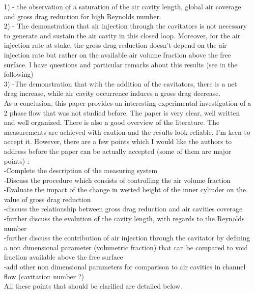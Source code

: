 \documentclass[10pt]{article}
\begin{document}
{1)     - the observation of a saturation of the air cavity length, global air coverage and gross drag reduction for high Reynolds number.\\
2)     - The demonstration that air injection through the cavitators is not necessary to generate and sustain the air cavity in this closed loop. Moreover, for the air injection rate at stake, the gross drag reduction doesn't depend on the air injection rate but rather on the available air volume fraction above the free surface. I have questions and particular remarks about this results (see in the following)\\
3)      -The demonstration that with the addition of the cavitators, there is a net drag increase, while air cavity occurrence induces a gross drag decrease. \vspace{\baselineskip}\\
As a conclusion, this paper provides an interesting experimental investigation of a 2 phase flow that was not studied before. The paper is very clear, well written and well organized. There is also a good overview of the literature. The measurements are achieved with caution and the results look reliable. I'm keen to accept it. However, there are a few points which I would like the authors to address before the paper can be actually accepted (some of them are major points) : \\
            -Complete the description of the measuring system\\
            -Discuss the procedure which consists of controlling the air volume fraction\\
            -Evaluate the impact of the change in wetted height of the inner cylinder on the value of gross drag reduction\\
            -discuss the relationship between gross drag reduction and air cavities coverage\\
            -further discuss the evolution of the cavity length, with regards to the Reynolds number\\
            -further discuss the contribution of air injection through the cavitator by defining a non dimensional parameter (volumetric fraction) that can be compared to void fraction available above the free surface\\
            -add other non dimensional parameters for comparison to air cavities in channel flow (cavitation number ?) \vspace{\baselineskip}\\
All these points that should be clarified are detailed below.}
\end{document}
